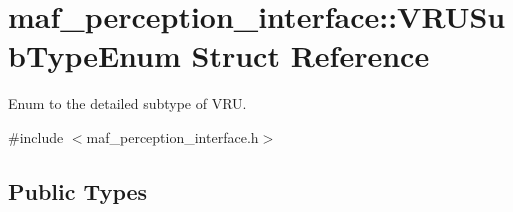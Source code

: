 \hypertarget{structmaf__perception__interface_1_1VRUSubTypeEnum}{}\section{maf\+\_\+perception\+\_\+interface\+:\+:V\+R\+U\+Sub\+Type\+Enum Struct Reference}
\label{structmaf__perception__interface_1_1VRUSubTypeEnum}


Enum to the detailed subtype of V\+RU.  




{\ttfamily \#include $<$maf\+\_\+perception\+\_\+interface.\+h$>$}

\subsection*{Public Types}
